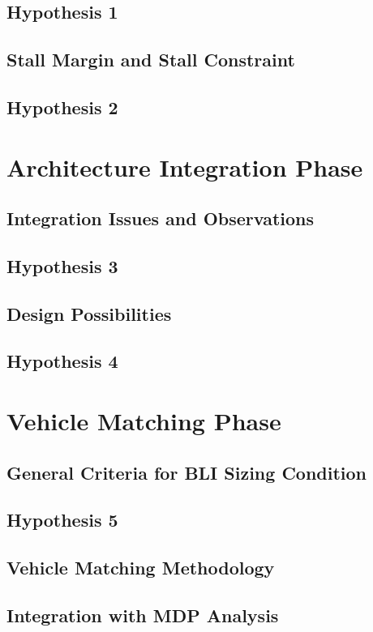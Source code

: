 \subsection{Hypothesis 1}

\subsection{Stall Margin and Stall Constraint}
\subsection{Hypothesis 2}

\section{Architecture Integration Phase}
\subsection{Integration Issues and Observations}
\subsection{Hypothesis 3}
\subsection{Design Possibilities}
\subsection{Hypothesis 4}

\section{Vehicle Matching Phase}
\subsection{General Criteria for BLI Sizing Condition}
\subsection{Hypothesis 5}
\subsection{Vehicle Matching Methodology}
\subsection{Integration with MDP Analysis}

